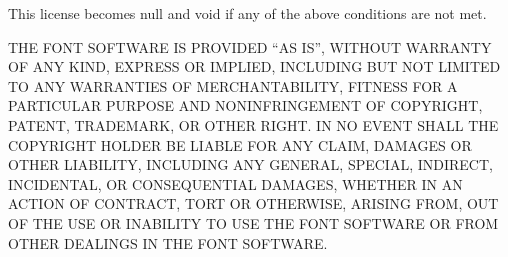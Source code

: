 \documentclass{fontdokuold}
\begin{document}

This license becomes null and void if any of the above conditions are
not met.


THE FONT SOFTWARE IS PROVIDED "`AS IS"', WITHOUT WARRANTY OF ANY KIND,
EXPRESS OR IMPLIED, INCLUDING BUT NOT LIMITED TO ANY WARRANTIES OF
MERCHANTABILITY, FITNESS FOR A PARTICULAR PURPOSE AND NONINFRINGEMENT
OF COPYRIGHT, PATENT, TRADEMARK, OR OTHER RIGHT. IN NO EVENT SHALL THE
COPYRIGHT HOLDER BE LIABLE FOR ANY CLAIM, DAMAGES OR OTHER LIABILITY,
INCLUDING ANY GENERAL, SPECIAL, INDIRECT, INCIDENTAL, OR CONSEQUENTIAL
DAMAGES, WHETHER IN AN ACTION OF CONTRACT, TORT OR OTHERWISE, ARISING
FROM, OUT OF THE USE OR INABILITY TO USE THE FONT SOFTWARE OR FROM
OTHER DEALINGS IN THE FONT SOFTWARE.

\end{document}
